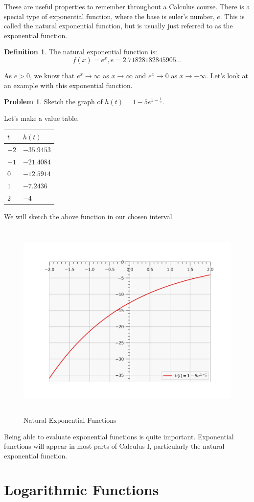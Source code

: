 \documentclass[12pt]{article}
\theoremstyle{definition}
\newtheorem{problem}{Problem}
\newtheorem{definition}{Definition}
\begin{document}
These are useful properties to remember throughout a Calculus course.
There is a special type of exponential function, where the base is euler's number, $e$.
This is called the natural exponential function, but is usually just referred to as the exponential function.

\begin{definition}
    The natural exponential function is:
    \begin{equation*}
        f(x) = e^x, e=2.71828182845905 \dots
    \end{equation*}
\end{definition}

As $e>0$, we know that $e^x \rightarrow \infty$ as $x \rightarrow \infty$ and $e^x \rightarrow 0$ as $x \rightarrow -\infty$.
Let's look at an example with this exponential function.

\begin{problem}
Sketch the graph of $h(t) = 1 - 5e^{1-\frac{t}{2}}$.
\end{problem}

Let's make a value table.

\begin{table}[]
    \renewcommand{\arraystretch}{1.5}
    \centering
    \begin{tabular}{>{\centering\arraybackslash}m{1cm}|>{\centering\arraybackslash}m{2cm}}
        $t$  & $h(t)$     \\ \hline
        $-2$ & $-35.9453$ \\
        $-1$ & $-21.4084$ \\
        $0$  & $-12.5914$ \\
        $1$  & $	-7.2436$ \\
        $2$  & $	-4$
    \end{tabular}
\end{table}

We will sketch the above function in our chosen interval.

\begin{figure}[H]
    \centering
    \includegraphics[width=12.5cm, height=10cm]{exponential_functions_2.png}
    \caption{Natural Exponential Functions}
    \label{fig:fig2}
\end{figure}

Being able to evaluate exponential functions is quite important.
Exponential functions will appear in most parts of Calculus I, particularly the natural exponential function.

\section{Logarithmic Functions}
\end{document}
